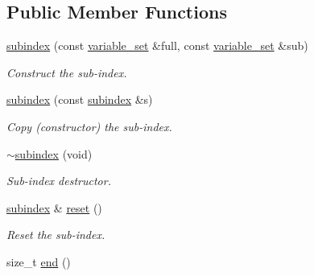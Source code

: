 \subsection*{Public Member Functions}
\begin{DoxyCompactItemize}
\item 
\hypertarget{classmerlin_1_1subindex_a4dc11ac00d5b35a1a576c079b61ba482}{}\hyperlink{classmerlin_1_1subindex_a4dc11ac00d5b35a1a576c079b61ba482}{subindex} (const \hyperlink{classmerlin_1_1variable__set}{variable\+\_\+set} \&full, const \hyperlink{classmerlin_1_1variable__set}{variable\+\_\+set} \&sub)\label{classmerlin_1_1subindex_a4dc11ac00d5b35a1a576c079b61ba482}

\begin{DoxyCompactList}\small\item\em Construct the sub-\/index. \end{DoxyCompactList}\item 
\hypertarget{classmerlin_1_1subindex_a3e0464e36f33fb7ceb0a797ff5296d32}{}\hyperlink{classmerlin_1_1subindex_a3e0464e36f33fb7ceb0a797ff5296d32}{subindex} (const \hyperlink{classmerlin_1_1subindex}{subindex} \&s)\label{classmerlin_1_1subindex_a3e0464e36f33fb7ceb0a797ff5296d32}

\begin{DoxyCompactList}\small\item\em Copy (constructor) the sub-\/index. \end{DoxyCompactList}\item 
\hypertarget{classmerlin_1_1subindex_a2d5988647a46e6373084f968f1a623bc}{}\hyperlink{classmerlin_1_1subindex_a2d5988647a46e6373084f968f1a623bc}{$\sim$subindex} (void)\label{classmerlin_1_1subindex_a2d5988647a46e6373084f968f1a623bc}

\begin{DoxyCompactList}\small\item\em Sub-\/index destructor. \end{DoxyCompactList}\item 
\hypertarget{classmerlin_1_1subindex_a0acd5e4bf8b9ed42b76c1c67ea9ad13e}{}\hyperlink{classmerlin_1_1subindex}{subindex} \& \hyperlink{classmerlin_1_1subindex_a0acd5e4bf8b9ed42b76c1c67ea9ad13e}{reset} ()\label{classmerlin_1_1subindex_a0acd5e4bf8b9ed42b76c1c67ea9ad13e}

\begin{DoxyCompactList}\small\item\em Reset the sub-\/index. \end{DoxyCompactList}\item 
\hypertarget{classmerlin_1_1subindex_a013078eb23f9c472347866c67951ce15}{}size\+\_\+t \hyperlink{classmerlin_1_1subindex_a013078eb23f9c472347866c67951ce15}{end} ()\label{classmerlin_1_1subindex_a013078eb23f9c472347866c67951ce15}


\end{DoxyCompactItemize}
